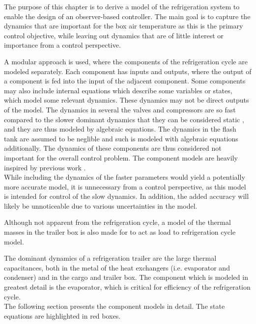 The purpose of this chapter is to derive a model of the refrigeration system to enable the design of an observer-based controller. The main goal is to capture the dynamics that are important for the box air temperature as this is the primary control objective, while leaving out dynamics that are of little interest or importance from a control perspective.

A modular approach is used, where the components of the refrigeration cycle are modeled separately. Each component has inputs and outputs, where the output of a component is fed into the input of the adjacent component. Some components may also include internal equations which describe some variables or states, which model some relevant dynamics. These dynamics may not be direct outputs of the model. The dynamics in several the valves and compressors are so fast compared to the slower dominant dynamics that they can be considered static \cite{Rasmussen2005}, and they are thus modeled by algebraic equations. The dynamics in the flash tank are assumed to be neglible and such is modeled with algebraic equations additionally.  
The dynamics of these components are thus considered not important for the overall control problem. The component models are heavily inspired by previous work \cite{Sorensen2013}. \\

While including the dynamics of the faster parameters would yield a potentially more accurate model, it is unnecessary from a control perspective, as this model is intended for control of the slow dynamics. In addition, the added accuracy will likely be unnoticeable due to various uncertainties in the model. 

Although not apparent from the refrigeration cycle, a model of the thermal masses in the trailer box is also made for to act as load to refrigeration cycle model.

The dominant dynamics of a refrigeration trailer are the large thermal capacitances, both in the metal of the heat exchangers (i.e. evaporator and condenser) and in the cargo and trailer box. The component which is modeled in greatest detail is the evaporator, which is critical for efficiency of the refrigeration cycle. \\

The following section presents the component models in detail. The state equations are highlighted in red boxes.